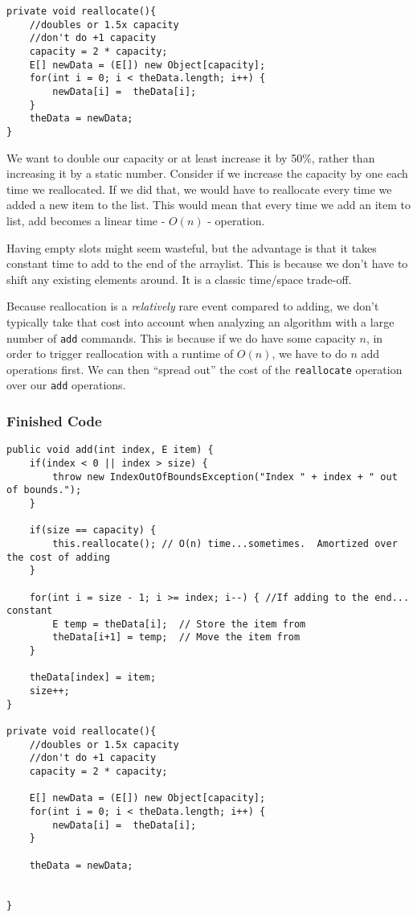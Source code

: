 \begin{verbatim}
private void reallocate(){
	//doubles or 1.5x capacity
	//don't do +1 capacity
	capacity = 2 * capacity;
	E[] newData = (E[]) new Object[capacity];
	for(int i = 0; i < theData.length; i++) {
		newData[i] =  theData[i];
	}
	theData = newData;
}
\end{verbatim}

We want to double our capacity or at least increase it by 50\%, rather than increasing it by a static number.
Consider if we increase the capacity by one each time we reallocated.  
If we did that, we would have to reallocate every time we added a new item to the list.  
This would mean that every time we add an item to list, add becomes a linear time - $O(n)$ - operation.


Having empty slots might seem wasteful, but the advantage is that it takes constant time to add to the end of the arraylist.  This is because we don't have to shift any existing elements around.  It is a classic time/space trade-off.

Because reallocation is a \textit{relatively} rare event compared to adding, we don't typically take that cost into account when analyzing an algorithm with a large number of \texttt{add} commands.  This is because if we do have some capacity $n$, in order to trigger reallocation with a runtime of $O(n)$, we have to do $n$ add operations first.
We can then ``spread out'' the cost of the \texttt{reallocate} operation over our \texttt{add} operations.


\subsubsection{Finished Code}
\begin{verbatim}
public void add(int index, E item) {
	if(index < 0 || index > size) {
		throw new IndexOutOfBoundsException("Index " + index + " out of bounds.");
	}
	
	if(size == capacity) {  
		this.reallocate(); // O(n) time...sometimes.  Amortized over the cost of adding
	}
	
	for(int i = size - 1; i >= index; i--) { //If adding to the end... constant
		E temp = theData[i];  // Store the item from 
		theData[i+1] = temp;  // Move the item from 
	}
	
	theData[index] = item;
	size++;
}

private void reallocate(){
	//doubles or 1.5x capacity
	//don't do +1 capacity
	capacity = 2 * capacity;
	
	E[] newData = (E[]) new Object[capacity];
	for(int i = 0; i < theData.length; i++) {
		newData[i] =  theData[i];
	}
	
	theData = newData;
	
	
}
\end{verbatim}


